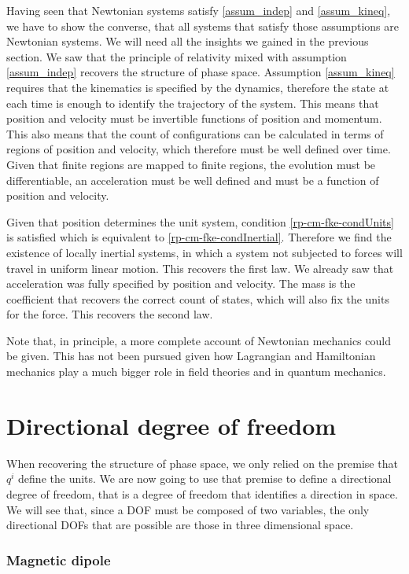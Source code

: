 Having seen that Newtonian systems satisfy \ref{assum_indep} and \ref{assum_kineq}, we have to show the converse, that all systems that satisfy those assumptions are Newtonian systems. We will need all the insights we gained in the previous section. We saw that the principle of relativity mixed with assumption \ref{assum_indep} recovers the structure of phase space. Assumption \ref{assum_kineq} requires that the kinematics is specified by the dynamics, therefore the state at each time is enough to identify the trajectory of the system. This means that position and velocity must be invertible functions of position and momentum. This also means that the count of configurations can be calculated in terms of regions of position and velocity, which therefore must be well defined over time. Given that finite regions are mapped to finite regions, the evolution must be differentiable, an acceleration must be well defined and must be a function of position and velocity.

Given that position determines the unit system, condition \ref{rp-cm-fke-condUnits} is satisfied which is equivalent to \ref{rp-cm-fke-condInertial}. Therefore we find the existence of locally inertial systems, in which a system not subjected to forces will travel in uniform linear motion. This recovers the first law. We already saw that acceleration was fully specified by position and velocity. The mass is the coefficient that recovers the correct count of states, which will also fix the units for the force. This recovers the second law.

Note that, in principle, a more complete account of Newtonian mechanics could be given. This has not been pursued given how Lagrangian and Hamiltonian mechanics play a much bigger role in field theories and in quantum mechanics.

\section{Directional degree of freedom}\label{rp-cm-secDirectionDOF}

When recovering the structure of phase space, we only relied on the premise that $q^i$ define the units. We are now going to use that premise to define a directional degree of freedom, that is a degree of freedom that identifies a direction in space. We will see that, since a DOF must be composed of two variables, the only directional DOFs that are possible are those in three dimensional space.

\subsubsection{Magnetic dipole}

